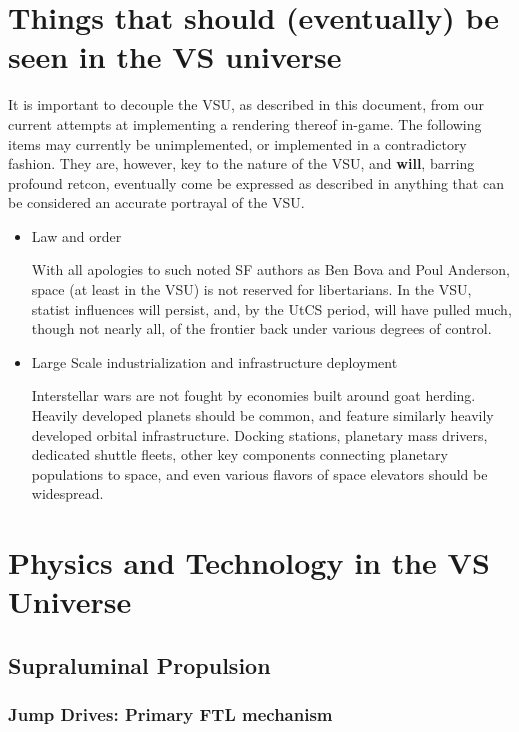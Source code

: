 \section{Things that should (eventually) be seen in the VS universe}
\label{sec:thingsseeninVSU}
It is important to decouple the VSU, as described in this document,
from our current attempts at implementing a rendering thereof
in-game. The following items may currently be unimplemented, or
implemented in a contradictory fashion. They are, however, key to the
nature of the VSU, and {\bf will}, barring profound retcon, eventually
come be expressed as described in anything that can be considered an
accurate portrayal of the VSU.

\begin{itemize}
\item Law and order

With all apologies to such noted SF authors as Ben Bova and Poul Anderson, space (at least in the VSU) is not
reserved for libertarians. In the VSU, statist influences will
persist, and, by the UtCS period, will have pulled much, though not
nearly all, of the frontier back under various degrees of control.

\item Large Scale industrialization and infrastructure deployment

Interstellar wars are not fought by economies built around goat
herding. Heavily developed planets should be common, and feature
similarly heavily developed orbital infrastructure. Docking stations,
planetary mass drivers, dedicated shuttle fleets, other key components
connecting planetary populations to space, and even various flavors of
space elevators should be widespread.

\end{itemize}


\section{Physics and Technology in the VS Universe}
\label{sec:VSphysics}

\subsection{Supraluminal Propulsion}

\subsubsection{Jump Drives: Primary FTL mechanism}

